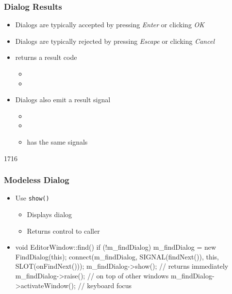 \begin{slide}\frametitle{Dialog Results}
  \begin{itemize}
  \item Dialogs are typically accepted by pressing \textit{Enter} or clicking \textit{OK}
  \item Dialogs are typically rejected by pressing \textit{Escape} or clicking \textit{Cancel}
  \item {} returns a result code
    \begin{itemize}
    \item {}
    \item {}
    \end{itemize}
  \item Dialogs also emit a result signal
    \begin{itemize}
    \item {}
    \item {}
    \item {} has the same signals
    \end{itemize}
  \end{itemize}
\end{slide}


\begin{slide}[fragile]{1716}
  \frametitle{Modeless Dialog}
  \begin{itemize}
 \item Use \texttt{show()}
    \begin{itemize}
    \item Displays dialog
    \item Returns control to caller
    \end{itemize}
  \item[]
    \begin{cpp}
void EditorWindow::find() {
  if (!m_findDialog) {
    m_findDialog = new FindDialog(this);
    connect(m_findDialog, SIGNAL(findNext()), 
      this, SLOT(onFindNext()));
  }
  m_findDialog->show(); // returns immediately
  m_findDialog->raise(); // on top of other windows
  m_findDialog->activateWindow(); // keyboard focus
}      
    \end{cpp}
  \end{itemize}
\end{slide}

